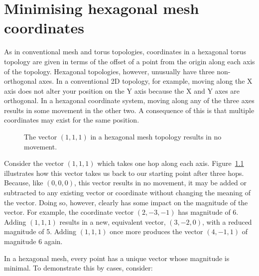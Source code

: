 \chapter{Minimising hexagonal mesh coordinates}
	\label{app:minimal-hex-coordinates}
	
	As in conventional mesh and torus topologies, coordinates in a hexagonal
	torus topology are given in terms of the offset of a point from the origin
	along each axis of the topology. Hexagonal topologies, however, unusually
	have three non-orthogonal axes. In a conventional 2D topology, for example,
	moving along the X axis does not alter your position on the Y axis because
	the X and Y axes are orthogonal. In a hexagonal coordinate system, moving
	along any of the three axes results in some movement in the other two. A
	consequence of this is that multiple coordinates may exist for the same
	position.
	
	\begin{figure}
		\center
		\caption[$(1,1,1)$ in a hexagonal mesh or torus.]%
		{The vector $(1, 1, 1)$ in a hexagonal mesh topology results in
		no movement.}
		\label{fig:hex-mesh-loop}
	\end{figure}
	
	Consider the vector $(1,1,1)$ which takes one hop along each axis.
	Figure~\ref{fig:hex-mesh-loop} illustrates how this vector takes us back to
	our starting point after three hops. Because, like $(0,0,0)$, this vector
	results in no movement, it may be added or subtracted to any existing vector
	or coordinate without changing the meaning of the vector. Doing so, however,
	clearly has some impact on the magnitude of the vector. For example, the
	coordinate vector $(2, -3, -1)$ has magnitude of 6. Adding $(1,1,1)$ results
	in a new, equivalent vector, $(3, -2, 0)$, with a reduced magnitude of 5.
	Adding $(1,1,1)$ once more produces the vector $(4, -1, 1)$ of magnitude 6
	again.
	
	In a hexagonal mesh, every point has a unique vector whose magnitude is
	minimal. To demonstrate this by cases, consider:
	
